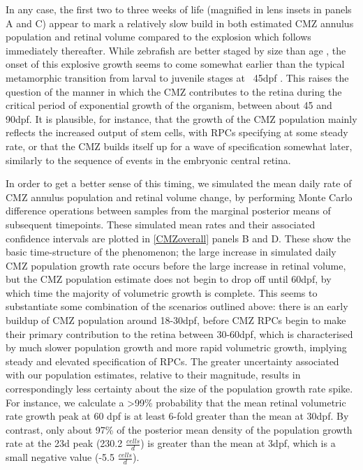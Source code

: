 In any case, the first two to three weeks of life (magnified in lens insets in panels A and C) appear to mark a relatively slow build in both estimated CMZ annulus population and retinal volume compared to the explosion which follows immediately thereafter. While zebrafish are better staged by size than age \cite{Parichy2009}, the onset of this explosive growth seems to come somewhat earlier than the typical metamorphic transition from larval to juvenile stages at ~45dpf \cite{Singleman2014}. This raises the question of the manner in which the CMZ contributes to the retina during the critical period of exponential growth of the organism, between about 45 and 90dpf. It is plausible, for instance, that the growth of the CMZ population mainly reflects the increased output of stem cells, with RPCs specifying at some steady rate, or that the CMZ builds itself up for a wave of specification somewhat later, similarly to the sequence of events in the embryonic central retina.

In order to get a better sense of this timing, we simulated the mean daily rate of CMZ annulus population and retinal volume change, by performing Monte Carlo difference operations between samples from the marginal posterior means of subsequent timepoints. These simulated mean rates and their associated confidence intervals are plotted in \autoref{CMZoverall} panels B and D. These show the basic time-structure of the phenomenon; the large increase in simulated daily CMZ population growth rate occurs before the large increase in retinal volume, but the CMZ population estimate does not begin to drop off until 60dpf, by which time the majority of volumetric growth is complete. This seems to substantiate some combination of the scenarios outlined above: there is an early buildup of CMZ population around 18-30dpf, before CMZ RPCs begin to make their primary contribution to the retina between 30-60dpf, which is characterised by much slower population growth and more rapid volumetric growth, implying steady and elevated specification of RPCs. The greater uncertainty associated with our population estimates, relative to their magnitude, results in correspondingly less certainty about the size of the population growth rate spike. For instance, we calculate a >99\% probability that the mean retinal volumetric rate growth peak at 60 dpf is at least 6-fold greater than the mean at 30dpf. By contrast, only about 97\% of the posterior mean density of  the population growth rate at the 23d peak (230.2 $\frac{cells}{d}$) is greater than the mean at 3dpf, which is a small negative value (-5.5 $\frac{cells}{d}$). 

